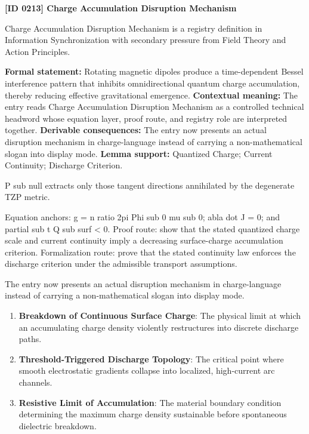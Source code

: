 \clearpage
\noindent\textbf{[ID 0213] Charge Accumulation Disruption Mechanism}\par
\vspace{0.35em}
\begingroup\small
{}
Charge Accumulation Disruption Mechanism is a registry definition in Information Synchronization with secondary pressure from Field Theory and Action Principles.

\begingroup\footnotesize\setlength{\emergencystretch}{3em}\sloppy
\textbf{Formal statement:} Rotating magnetic dipoles produce a time-dependent Bessel interference pattern that inhibits omnidirectional quantum charge accumulation, thereby reducing effective gravitational emergence. \textbf{Contextual meaning:} The entry reads Charge Accumulation Disruption Mechanism as a controlled technical headword whose equation layer, proof route, and registry role are interpreted together. \textbf{Derivable consequences:} The entry now presents an actual disruption mechanism in charge-language instead of carrying a non-mathematical slogan into display mode. \textbf{Lemma support:} Quantized Charge; Current Continuity; Discharge Criterion.\par
\endgroup

P sub null extracts only those tangent directions annihilated by the degenerate TZP metric.

Equation anchors: g = n ratio 2pi Phi sub 0 mu sub 0; abla dot J = 0; and partial sub t Q sub surf < 0. Proof route: show that the stated quantized charge scale and current continuity imply a decreasing surface-charge accumulation criterion. Formalization route: prove that the stated continuity law enforces the discharge criterion under the admissible transport assumptions.

The entry now presents an actual disruption mechanism in charge-language instead of carrying a non-mathematical slogan into display mode.
\endgroup

\begin{enumerate}[leftmargin=1.6em,itemsep=6pt,topsep=4pt]
\item \textbf{Breakdown of Continuous Surface Charge}: The physical limit at which an accumulating charge density violently restructures into discrete discharge paths.
\item \textbf{Threshold-Triggered Discharge Topology}: The critical point where smooth electrostatic gradients collapse into localized, high-current arc channels.
\item \textbf{Resistive Limit of Accumulation}: The material boundary condition determining the maximum charge density sustainable before spontaneous dielectric breakdown.
\end{enumerate}

